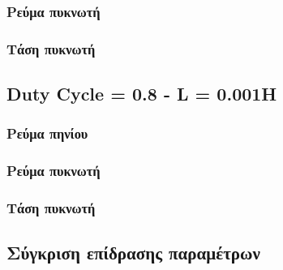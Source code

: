 \subsubsection{Ρεύμα πυκνωτή}
\subsubsection{Τάση πυκνωτή}
\subsection{Duty Cycle = 0.8  -  L = 0.001H}
\subsubsection{Ρεύμα πηνίου}
\subsubsection{Ρεύμα πυκνωτή}
\subsubsection{Τάση πυκνωτή}
\subsection{Σύγκριση επίδρασης παραμέτρων}